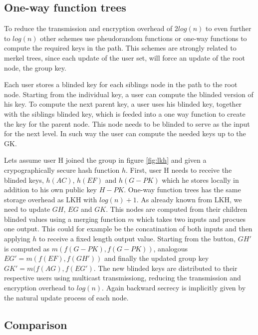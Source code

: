 \subsection{One-way function trees}
To reduce the transmission and encryption overhead of $2log(n)$ to even further to $log(n)$ other schemes use pheudorandom functions \cite{canetti1999multicast} or one-way functions \cite{sherman2003key} to compute the required keys in the path. This schemes are strongly related to merkel trees, since each update of the user set, will force an update of the root node, the group key.

Each user stores a blinded key for each siblings node in the path to the root node. Starting from the individual key, a user can compute the blinded version of his key. To compute the next parent key, a user uses his blinded key, together with the siblings blinded key, which is feeded into a one way function to create the key for the parent node. This node needs to be blinded to serve as the input for the next level. In such way the user can compute the needed keys up to the GK. 

Lets assume user H joined the group in figure \ref{fig:lkh} and given a crypographically secure hash function $h$. First, user H needs to receive the blinded keys, $h(AC)$, $h(EF)$ and $h(G-PK)$ which he stores locally in addition to his own public key $H-PK$. One-way function trees has the same storage overhead as LKH with $log(n) + 1$.  As already known from LKH, we need to update $GH$, $EG$ and $GK$. This nodes are computed from their children blinded values using a merging function $m$ which takes two inputs and procues one output. This could for example be the concatination of both inputs and then applying $h$ to receive a fixed length output value. Starting from the button,  $GH'$ is computed as $m(f(G-PK), f(G-PK))$, analogous $EG' = m(f(EF), f(GH'))$ and finally the updated group key $GK' = m(f(AG), f(EG')$. The new blinded keys are distributed to their respective users using multicast transmissiong, reducing the transmission and encryption overhead to $log(n)$. Again backward secrecy is implicitly given by the natural update process of each node.


\subsection{Comparison}


